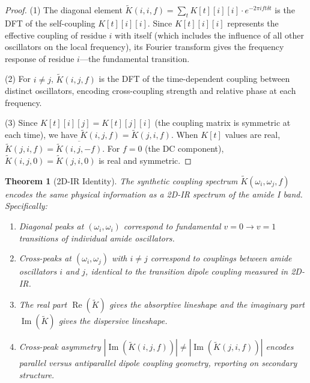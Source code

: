 \documentclass[11pt,twocolumn,a4paper]{article}
\newtheorem{theorem}{Theorem}[section]
\theoremstyle{definition}
\theoremstyle{remark}
\newcommand{\Ktilde}{\tilde{K}}
\newcommand{\natfreq}{\omega}
\begin{document}
\begin{proof}
(1) The diagonal element $\Ktilde(i, i, f) = \sum_t K[t][i][i] \cdot e^{-2\pi i f t \delta t}$ is the DFT of the self-coupling $K[t][i][i]$. Since $K[t][i][i]$ represents the effective coupling of residue $i$ with itself (which includes the influence of all other oscillators on the local frequency), its Fourier transform gives the frequency response of residue $i$---the fundamental transition.

(2) For $i \neq j$, $\Ktilde(i, j, f)$ is the DFT of the time-dependent coupling between distinct oscillators, encoding cross-coupling strength and relative phase at each frequency.

(3) Since $K[t][i][j] = K[t][j][i]$ (the coupling matrix is symmetric at each time), we have $\Ktilde(i, j, f) = \Ktilde(j, i, f)$. When $K[t]$ values are real, $\Ktilde(j, i, f) = \overline{\Ktilde(i, j, -f)}$. For $f = 0$ (the DC component), $\Ktilde(i, j, 0) = \Ktilde(j, i, 0)$ is real and symmetric.
\end{proof}

\begin{theorem}[2D-IR Identity]
\label{thm:2dir_identity}
The synthetic coupling spectrum $\Ktilde(\natfreq_i, \natfreq_j, f)$ encodes the same physical information as a 2D-IR spectrum of the amide I band. Specifically:
\begin{enumerate}
    \item Diagonal peaks at $(\natfreq_i, \natfreq_i)$ correspond to fundamental $v=0 \to v=1$ transitions of individual amide oscillators.
    \item Cross-peaks at $(\natfreq_i, \natfreq_j)$ with $i \neq j$ correspond to couplings between amide oscillators $i$ and $j$, identical to the transition dipole coupling measured in 2D-IR.
    \item The real part $\operatorname{Re}(\Ktilde)$ gives the absorptive lineshape and the imaginary part $\operatorname{Im}(\Ktilde)$ gives the dispersive lineshape.
    \item Cross-peak asymmetry $|\operatorname{Im}(\Ktilde(i,j,f))| \neq |\operatorname{Im}(\Ktilde(j,i,f))|$ encodes parallel versus antiparallel dipole coupling geometry, reporting on secondary structure.
\end{enumerate}
\end{theorem}
\end{document}
